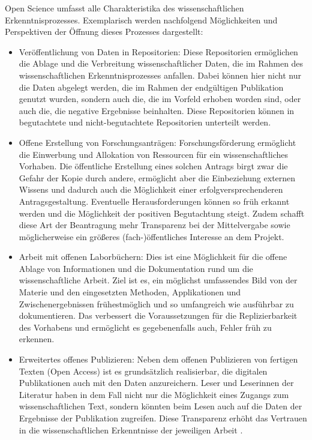Open Science umfasst alle Charakteristika des wissenschaftlichen Erkenntnisprozesses. Exemplarisch werden nachfolgend Möglichkeiten und Perspektiven der Öffnung dieses Prozesses dargestellt:
\begin{itemize}
\item Veröffentlichung von Daten in Repositorien: Diese Repositorien ermöglichen die Ablage und die Verbreitung wissenschaftlicher Daten, die im Rahmen des wissenschaftlichen Erkenntnisprozesses anfallen. Dabei können hier nicht nur die Daten abgelegt werden, die im Rahmen der endgültigen Publikation genutzt wurden, sondern auch die, die im Vorfeld erhoben worden sind, oder auch die, die negative Ergebnisse beinhalten. Diese Repositorien können in begutachtete und nicht-begutachtete Repositorien unterteilt werden.
\item Offene Erstellung von Forschungsanträgen: Forschungsförderung ermöglicht die Einwerbung und Allokation von Ressourcen für ein wissenschaftliches Vorhaben. Die öffentliche Erstellung eines solchen Antrags birgt zwar die Gefahr der Kopie durch andere, ermöglicht aber die Einbeziehung externen Wissens und dadurch auch die Möglichkeit einer erfolgversprechenderen Antragsgestaltung. Eventuelle Herausforderungen können so früh erkannt werden und die Möglichkeit der positiven Begutachtung steigt. Zudem schafft diese Art der Beantragung mehr Transparenz bei der Mittelvergabe sowie möglicherweise ein größeres (fach-)öffentliches Interesse an dem Projekt.
\item Arbeit mit offenen Laborbüchern: Dies ist eine Möglichkeit für die offene Ablage von Informationen und die Dokumentation rund um die wissenschaftliche Arbeit. Ziel ist es, ein möglichst umfassendes Bild von der Materie und den eingesetzten Methoden, Applikationen und Zwischenergebnissen frühestmöglich und so umfangreich wie ausführbar zu dokumentieren. Das verbessert die Voraussetzungen für die Replizierbarkeit des Vorhabens \cite[:119]{Mayring_1999} und ermöglicht es gegebenenfalls auch, Fehler früh zu erkennen.
\item	Erweitertes offenes Publizieren: Neben dem offenen Publizieren von fertigen Texten (Open Access) ist es grundsätzlich realisierbar, die digitalen Publikationen auch mit den Daten anzureichern. Leser und Leserinnen der Literatur haben in dem Fall nicht nur die Möglichkeit eines Zugangs zum wissenschaftlichen Text, sondern könnten beim Lesen auch auf die Daten der Ergebnisse der Publikation zugreifen. Diese Transparenz erhöht das Vertrauen in die wissenschaftlichen Erkenntnisse der jeweiligen Arbeit \cite{Nosek_2015}.

\end{itemize}
